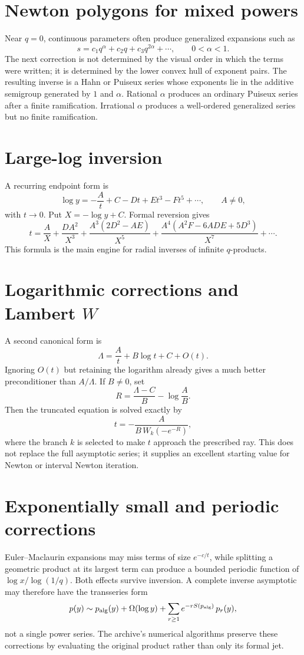 \documentclass[11pt,letterpaper,oneside,openany]{book}
\theoremstyle{definition}
\theoremstyle{remark}
\begin{document}
\section{Newton polygons for mixed powers}\label{sec:newton-polygon-placeholder}
Near \(q=0\), continuous parameters often produce generalized expansions such
as
\[
 s=c_1q^\alpha+c_2q+c_3q^{2\alpha}+\cdots,
 \qquad 0<\alpha<1.
\]
The next correction is not determined by the visual order in which the terms
were written; it is determined by the lower convex hull of exponent pairs.
The resulting inverse is a Hahn or Puiseux series whose exponents lie in the
additive semigroup generated by \(1\) and \(\alpha\).  Rational \(\alpha\)
produces an ordinary Puiseux series after a finite ramification.  Irrational
\(\alpha\) produces a well-ordered generalized series but no finite
ramification.

\section{Large-log inversion}
A recurring endpoint form is
\[
 \log y=-\frac{A}{t}+C-Dt+Et^3-Ft^5+\cdots,
 \qquad A\ne0,
\]
with \(t\to0\).  Put \(X=-\log y+C\).  Formal reversion gives
\begin{equation}\label{eq:large-log-reversion}
 t=\frac{A}{X}+\frac{DA^2}{X^3}
 +\frac{A^3(2D^2-AE)}{X^5}
 +\frac{A^4(A^2F-6ADE+5D^3)}{X^7}+\cdots.
\end{equation}
This formula is the main engine for radial inverses of infinite
\(q\)-products.

\section{Logarithmic corrections and Lambert \texorpdfstring{\(W\)}{W}}
A second canonical form is
\[
 \Lambda=\frac{A}{t}+B\log t+C+O(t).
\]
Ignoring \(O(t)\) but retaining the logarithm already gives a much better
preconditioner than \(A/\Lambda\).  If \(B\ne0\), set
\[
 R=\frac{\Lambda-C}{B}-\log\frac{A}{B}.
\]
Then the truncated equation is solved exactly by
\begin{equation}\label{eq:lambert-preconditioner}
 t=-\frac{A}{B\,W_k(-e^{-R})},
\end{equation}
where the branch \(k\) is selected to make \(t\) approach the prescribed ray.
This does not replace the full asymptotic series; it supplies an excellent
starting value for Newton or interval Newton iteration.

\section{Exponentially small and periodic corrections}
Euler--Maclaurin expansions may miss terms of size \(e^{-c/t}\), while splitting
a geometric product at its largest term can produce a bounded periodic
function of \(\log x/\log(1/q)\).  Both effects survive inversion.  A complete
inverse asymptotic may therefore have the transseries form
\[
 p(y)\sim p_{\rm alg}(y)+\Omega(\log y)+
 \sum_{r\ge1}e^{-rS(p_{\rm alg})}\,p_r(y),
\]
not a single power series.  The archive's numerical algorithms preserve these
corrections by evaluating the original product rather than only its formal
jet.
\end{document}
